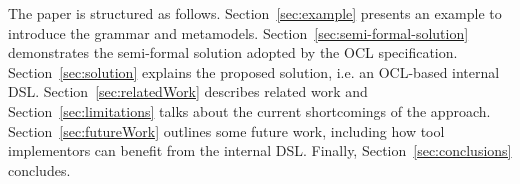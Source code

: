 \documentclass{llncs}
\begin{document}

The paper is structured as follows. Section~\ref{sec:example} presents an example to introduce the grammar and metamodels. Section~\ref{sec:semi-formal-solution} demonstrates the semi-formal solution adopted by the OCL specification. Section~\ref{sec:solution} explains the proposed solution, i.e. an OCL-based internal DSL. Section~\ref{sec:relatedWork} describes related work and Section~\ref{sec:limitations} talks about the current shortcomings of the approach. Section~\ref{sec:futureWork} outlines some future work, including how tool implementors can benefit from the internal DSL. Finally, Section~\ref{sec:conclusions} concludes.




\end{document}
